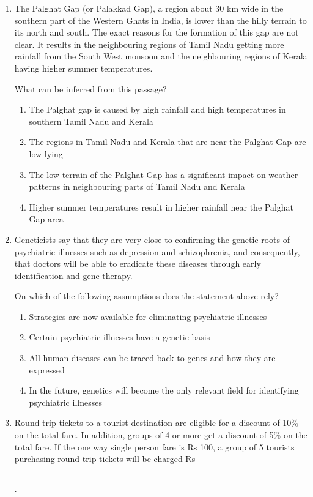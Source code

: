 \documentclass[journal,12pt,onecolumn]{IEEEtran}
\begin{document}
\begin{enumerate}[label=Q\arabic*:, leftmargin=*, itemindent=0pt, resume]

\item The Palghat Gap (or Palakkad Gap), a region about 30 km wide in the southern part of the Western Ghats in India, is lower than the hilly terrain to its north and south. The exact reasons for the formation of this gap are not clear. It results in the neighbouring regions of Tamil Nadu getting more rainfall from the South West monsoon and the neighbouring regions of Kerala having higher summer temperatures.

What can be inferred from this passage?

\begin{enumerate}[label=(\Alph*), nosep]
\item The Palghat gap is caused by high rainfall and high temperatures in southern Tamil Nadu and Kerala
\item The regions in Tamil Nadu and Kerala that are near the Palghat Gap are low-lying
\item The low terrain of the Palghat Gap has a significant impact on weather patterns in neighbouring parts of Tamil Nadu and Kerala
\item Higher summer temperatures result in higher rainfall near the Palghat Gap area
\end{enumerate}

\item Geneticists say that they are very close to confirming the genetic roots of psychiatric illnesses such as depression and schizophrenia, and consequently, that doctors will be able to eradicate these diseases through early identification and gene therapy.

On which of the following assumptions does the statement above rely?

\begin{enumerate}[label=(\Alph*), nosep]
\item Strategies are now available for eliminating psychiatric illnesses
\item Certain psychiatric illnesses have a genetic basis
\item All human diseases can be traced back to genes and how they are expressed
\item In the future, genetics will become the only relevant field for identifying psychiatric illnesses
\end{enumerate}

\item Round-trip tickets to a tourist destination are eligible for a discount of 10\% on the total fare. In addition, groups of 4 or more get a discount of 5\% on the total fare. If the one way single person fare is Rs 100, a group of 5 tourists purchasing round-trip tickets will be charged Rs \rule{4cm}{0.15mm}.


\end{enumerate}
\end{document}

